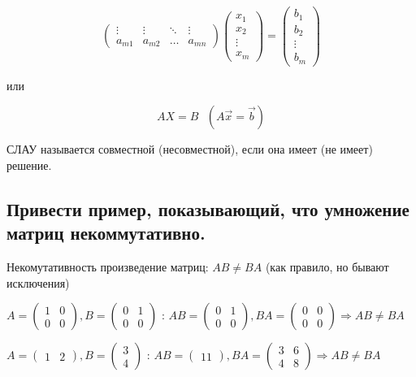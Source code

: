 \begin{enumerate}
$$\begin{pmatrix}
        \vdots&\vdots&\ddots&\vdots\\
        a_{m1}&a_{m2}&\ldots&a_{mn}
    \end{pmatrix}
    \begin{pmatrix}
        x_{1}\\x_{2}\\\vdots\\x_{m}
    \end{pmatrix} = 
    \begin{pmatrix}
        b_{1}\\b_{2}\\\vdots\\b_{m}
    \end{pmatrix}
    $$
    \begin{center} или \end{center}
    $$
    AX = B \text{ } (A\vec{x} = \vec{b})
    $$
    
\end{enumerate}

СЛАУ называется совместной (несовместной), если она имеет (не имеет) решение.

\subsection{Привести пример, показывающий, что умножение матриц некоммутативно.}

Некомутативность произведение матриц: $AB\ne BA$ (как правило, но бывают исключения)

$A = \begin{pmatrix}1&0\\0&0\end{pmatrix}, 
           B = \begin{pmatrix}0&1\\0&0\end{pmatrix}$ :  $
           AB = \begin{pmatrix}0&1\\0&0\end{pmatrix},
           BA = \begin{pmatrix}0&0\\0&0\end{pmatrix}
           \Rightarrow AB \ne BA$
\vspace*{15pt}

$A = \begin{pmatrix}1&2\end{pmatrix}, 
           B = \begin{pmatrix}3\\4\end{pmatrix}$ :  $
           AB = \begin{pmatrix}11\end{pmatrix},
           BA = \begin{pmatrix}3&6\\4&8\end{pmatrix}
           \Rightarrow AB \ne BA$


